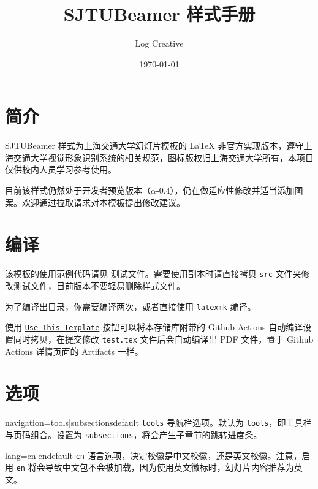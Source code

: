 \documentclass[a4paper,12pt]{article}
\begin{document}
\begin{CJK}{UTF8}{song}
\title{\textsf{SJTUBeamer} 样式手册}
\author{Log Creative}
\date{\today}
\maketitle

\tableofcontents    %

\section{简介}

\textsf{SJTUBeamer} 样式为上海交通大学幻灯片模板的 \LaTeX{} 非官方实现版本，遵守\href{http://vi.sjtu.edu.cn/}{上海交通大学视觉形象识别系统}的相关规范，图标版权归上海交通大学所有，本项目仅供校内人员学习参考使用。

目前该样式仍然处于开发者预览版本（$\alpha$-0.4），仍在做适应性修改并适当添加图案。欢迎通过拉取请求对本模板提出修改建议。

\section{编译}

该模板的使用范例代码请见 \href{https://github.com/LogCreative/SJTUBeamer/blob/main/src/test.tex}{测试文件}。需要使用副本时请直接拷贝 \verb"src" 文件夹修改测试文件，目前版本不要轻易删除样式文件。

为了编译出目录，你需要编译两次，或者直接使用 \verb"latexmk" 编译。

使用 \href{https://github.com/LogCreative/SJTUBeamer/generate}{\texttt{Use This Template}} 按钮可以将本存储库附带的 Github Actions 自动编译设置同时拷贝，在提交修改 \verb"test.tex" 文件后会自动编译出 PDF 文件，置于 Github Actions 详情页面的 Artifacts 一栏。

\section{选项}

\begin{docKey*}[SJTUBeamer]{navigation}{=tools|subsections}{default \texttt{tools}}
    导航栏选项。默认为 \verb"tools"，即工具栏与页码组合。设置为 \verb"subsections"，将会产生子章节的跳转进度条。
\end{docKey*}

\begin{docKey*}[SJTUBeamer]{lang}{=cn|en}{default \texttt{cn}}
    语言选项，决定校徽是中文校徽，还是英文校徽。注意，启用 \texttt{en} 将会导致中文包不会被加载，因为使用英文徽标时，幻灯片内容推荐为英文。
\end{docKey*}


\end{CJK}
\end{document}
